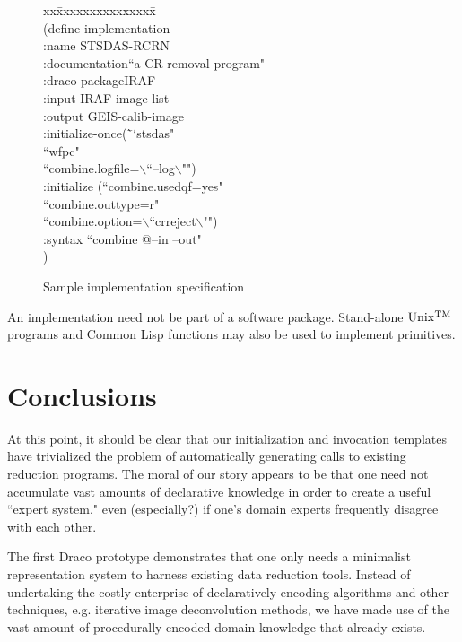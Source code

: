 \begin{figure}
\caption{Sample implementation specification}
\begin{tabbing}
xx\=xxxxxxxxxxxxxxx\=\kill
\\
(define-implementation\\
	\>:name		\>STSDAS-RCRN\\
	\>:documentation\>``a CR removal program"\\
	\>:draco-package\>IRAF\\
	\>:input	\>IRAF-image-list\\
	\>:output	\>GEIS-calib-image\\
	\>:initialize-once\>(\=``stsdas"\\
		\>\>\>``wfpc"\\
		\>\>\>``combine.logfile=$\backslash$``--log$\backslash$"")\\
	\>:initialize	\>(``combine.usedqf=yes"\\
		\>\>\>``combine.outtype=r"\\
		\>\>\>``combine.option=$\backslash$``crreject$\backslash$"")\\
	\>:syntax	\>``combine @--in --out"\\
)
\end{tabbing}
\end{figure}

An implementation need not be part of a software package.  Stand-alone
$\rm Unix^{\tiny TM}$ programs and Common Lisp functions may also be used
to implement primitives.

\section{Conclusions}
At this point, it should be clear that our initialization and invocation
templates have trivialized the problem of automatically generating calls to
existing reduction programs.  The moral of our story appears to be that one
need not accumulate vast amounts of declarative knowledge in order to create
a useful ``expert system," even (especially?) if one's domain experts
frequently disagree with each other.

The first Draco prototype demonstrates that one only needs a minimalist
representation system to harness existing data reduction tools.  Instead of
undertaking the costly enterprise of declaratively encoding algorithms and
other techniques, e.g. iterative image deconvolution methods, we have made
use of the vast amount of procedurally-encoded domain knowledge that already
exists.

